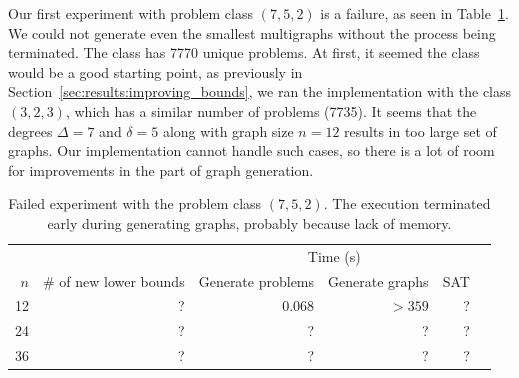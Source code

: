 Our first experiment with problem class $(7,5,2)$ is a failure, as seen in Table~\ref{tbl:results:new_lower_bounds_for_classes:7_5_2}.
We could not generate even the smallest multigraphs without the process being terminated.
The class has 7770 unique problems.
At first, it seemed the class would be a good starting point, as previously in Section~\ref{sec:results:improving_bounds}, we ran the implementation with the class $(3,2,3)$, which has a similar number of problems (7735).
It seems that the degrees $\Delta=7$ and $\delta=5$ along with graph size $n=12$ results in too large set of graphs.
Our implementation cannot handle such cases, so there is a lot of room for improvements in the part of graph generation.
\begin{table}[H]
    \centering
    \begin{tabular}{rrrrrr}
        \toprule
        && \multicolumn{3}{c}{Time (s)} \\
        \cmidrule{3-5}
        $n$ & \# of new lower bounds & Generate problems & Generate graphs & SAT\\
        \midrule
        12  & ?  & 0.068  & $>359$  & ?\\
        24 & ? & ? & ? & ? \\
        36 & ? & ? & ? & ? \\
        \bottomrule
    \end{tabular}
    \caption{%
    Failed experiment with the problem class $(7,5,2)$.
    The execution terminated early during generating graphs, probably because lack of memory.
    }
    \label{tbl:results:new_lower_bounds_for_classes:7_5_2}
\end{table}

